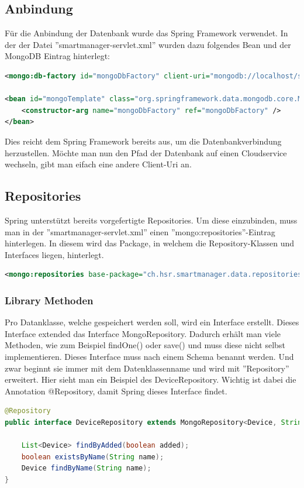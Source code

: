 \subsection{Anbindung}
Für die Anbindung der Datenbank wurde das Spring Framework verwendet. In der der Datei ''smartmanager-servlet.xml'' wurden dazu folgendes Bean und der MongoDB Eintrag hinterlegt:
\begin{lstlisting}[language=xml]
<mongo:db-factory id="mongoDbFactory" client-uri="mongodb://localhost/smartmanager" />

<bean id="mongoTemplate" class="org.springframework.data.mongodb.core.MongoTemplate">
	<constructor-arg name="mongoDbFactory" ref="mongoDbFactory" />
</bean>
\end{lstlisting}
Dies reicht dem Spring Framework bereits aus, um die Datenbankverbindung herzustellen. Möchte man nun den Pfad der Datenbank auf einen Cloudservice wechseln, gibt man eifach eine andere Client-Uri an.

\subsection{Repositories}
Spring unterstützt bereits vorgefertigte Repositories. Um diese einzubinden, muss man in der ''smartmanager-servlet.xml'' einen ''mongo:repositories''-Eintrag hinterlegen. In diesem wird das Package, in welchem die Repository-Klassen und Interfaces liegen, hinterlegt.
\begin{lstlisting}[language=xml]
<mongo:repositories base-package="ch.hsr.smartmanager.data.repositories" />
\end{lstlisting}

\subsubsection{Library Methoden}
Pro Datanklasse, welche gespeichert werden soll, wird ein Interface erstellt. Dieses Interface extended das Interface MongoRepository. Dadurch erhält man viele Methoden, wie zum Beispiel findOne() oder save() und muss diese nicht selbst implementieren. Dieses Interface muss nach einem Schema benannt werden. Und zwar beginnt sie immer mit dem Datenklassenname und wird mit ''Repository'' erweitert. Hier sieht man ein Beispiel des DeviceRepository. Wichtig ist dabei die Annotation @Repository, damit Spring dieses Interface findet. 
\begin{lstlisting}[language=java]
@Repository
public interface DeviceRepository extends MongoRepository<Device, String>, DeviceRepositoryCustom {
	
	List<Device> findByAdded(boolean added);
	boolean existsByName(String name);
	Device findByName(String name);
}
\end{lstlisting}

